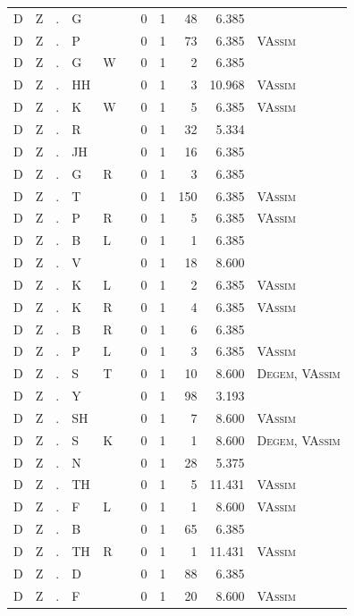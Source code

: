 \documentclass[12pt]{article}
\begin{document}
\begin{longtable}{r@{ } r@{ } c@{ } l@{ } l@{ } l@{ } r r r r l }
D & Z & . & G &  &  & 0 & 1 & 48 & 6.385 &  \\
D & Z & . & P &  &  & 0 & 1 & 73 & 6.385 & \textsc{VAssim} \\
D & Z & . & G & W &  & 0 & 1 & 2 & 6.385 &  \\
D & Z & . & HH &  &  & 0 & 1 & 3 & 10.968 & \textsc{VAssim} \\
D & Z & . & K & W &  & 0 & 1 & 5 & 6.385 & \textsc{VAssim} \\
D & Z & . & R &  &  & 0 & 1 & 32 & 5.334 &  \\
D & Z & . & JH &  &  & 0 & 1 & 16 & 6.385 &  \\
D & Z & . & G & R &  & 0 & 1 & 3 & 6.385 &  \\
D & Z & . & T &  &  & 0 & 1 & 150 & 6.385 & \textsc{VAssim} \\
D & Z & . & P & R &  & 0 & 1 & 5 & 6.385 & \textsc{VAssim} \\
D & Z & . & B & L &  & 0 & 1 & 1 & 6.385 &  \\
D & Z & . & V &  &  & 0 & 1 & 18 & 8.600 &  \\
D & Z & . & K & L &  & 0 & 1 & 2 & 6.385 & \textsc{VAssim} \\
D & Z & . & K & R &  & 0 & 1 & 4 & 6.385 & \textsc{VAssim} \\
D & Z & . & B & R &  & 0 & 1 & 6 & 6.385 &  \\
D & Z & . & P & L &  & 0 & 1 & 3 & 6.385 & \textsc{VAssim} \\
D & Z & . & S & T &  & 0 & 1 & 10 & 8.600 & \textsc{Degem}, \textsc{VAssim} \\
D & Z & . & Y &  &  & 0 & 1 & 98 & 3.193 &  \\
D & Z & . & SH &  &  & 0 & 1 & 7 & 8.600 & \textsc{VAssim} \\
D & Z & . & S & K &  & 0 & 1 & 1 & 8.600 & \textsc{Degem}, \textsc{VAssim} \\
D & Z & . & N &  &  & 0 & 1 & 28 & 5.375 &  \\
D & Z & . & TH &  &  & 0 & 1 & 5 & 11.431 & \textsc{VAssim} \\
D & Z & . & F & L &  & 0 & 1 & 1 & 8.600 & \textsc{VAssim} \\
D & Z & . & B &  &  & 0 & 1 & 65 & 6.385 &  \\
D & Z & . & TH & R &  & 0 & 1 & 1 & 11.431 & \textsc{VAssim} \\
D & Z & . & D &  &  & 0 & 1 & 88 & 6.385 &  \\
D & Z & . & F &  &  & 0 & 1 & 20 & 8.600 & \textsc{VAssim} \\

\end{longtable}
\end{document}
